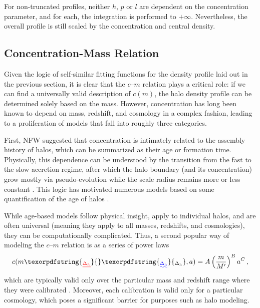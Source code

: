 \documentclass[5p,aas_macros]{elsarticle}
\providecommand{\DIFaddtex}[1]{{\protect\color{blue}\uwave{#1}}} %
\providecommand{\DIFdeltex}[1]{{\protect\color{red}\sout{#1}}}                      %
\providecommand{\DIFaddbegin}{} %
\providecommand{\DIFaddend}{} %
\providecommand{\DIFdelbegin}{} %
\providecommand{\DIFdelend}{} %
\providecommand{\DIFadd}[1]{\texorpdfstring{\DIFaddtex{#1}}{#1}} %
\providecommand{\DIFdel}[1]{\texorpdfstring{\DIFdeltex{#1}}{}} %
\begin{document}
For non-truncated profiles, neither $h$, $p$ or $l$ are dependent on the concentration parameter, and for each, the integration is performed to $+\infty$. Nevertheless, the overall profile is still scaled by the concentration and central density. 

\subsection{Concentration-Mass Relation}
\label{sec:theory:concentration}
Given the logic of self-similar fitting functions for the density profile laid out in the previous section, it is clear that the $c$--$m$ relation plays a critical role: if we can find a universally valid description of $c(m)$, the halo density profile can be determined solely based on the mass. However, concentration has long been known to depend on mass, redshift, and cosmology in a complex fashion, leading to a proliferation of models that fall into roughly three categories.

First, NFW suggested that concentration is intimately related to the assembly history of halos, which can be summarized as their age or formation time. Physically, this dependence can be understood by the transition from the fast to the slow accretion regime, after which the halo boundary (and its concentration) grow mostly via pseudo-evolution while the scale radius remains more or less constant \citep{Navarro1997, Bullock2001, Bosch2002, Wechsler2002, Zhao2003, Dalal2010, Diemer2013, Ludlow2013, Wang2020}. This logic has motivated numerous models based on some quantification of the age of halos \citep[e.g.,][]{Eke2001, Zhao2009, Giocoli2012, Ludlow2014, Ludlow2016, Correa2015b}. 

While age-based models follow physical insight, apply to individual halos, and are often universal (meaning they apply to all masses, redshifts, and cosmologies), they can be computationally complicated. Thus, a second popular way of modeling the $c$--$m$ relation is as a series of power laws 
\begin{equation}
    c(m\DIFdelbegin \DIFdel{_{\Delta_h}}\DIFdelend \DIFaddbegin \DIFadd{_{\Delta_{\rm h}}}\DIFaddend ,a) = A\left(\frac{m}{M'}\right)^B a^C \,,
\end{equation}
which are typically valid only over the particular mass and redshift range where they were calibrated \citep[e.g.,][]{Dolag2004, Duffy2008, Maccio2008, Bhattacharya2013, Dutton2014, Klypin2016, Child2018}. Moreover, each calibration is valid only for a particular cosmology, which poses a significant barrier for purposes such as halo modeling.
\end{document}
